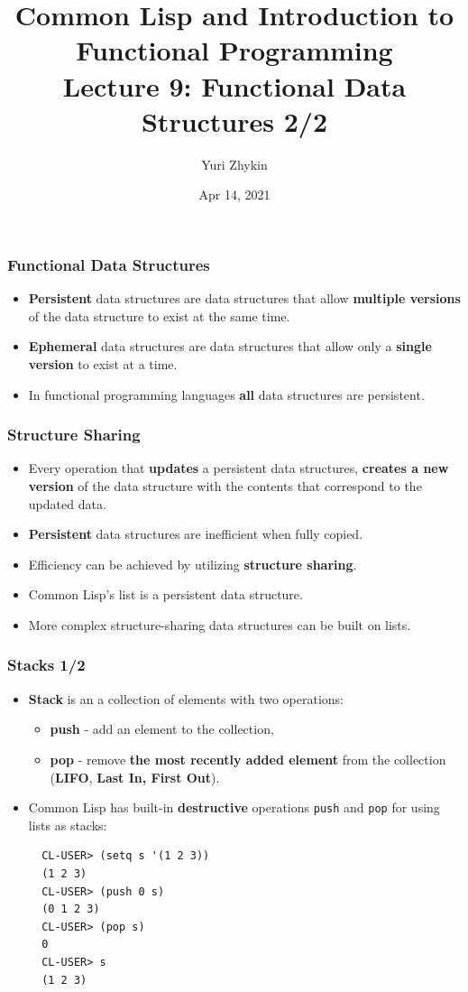 \documentclass{beamer}
\title{
  Common Lisp and Introduction to Functional Programming \\
  Lecture 9: Functional Data Structures 2/2
}
\author{Yuri Zhykin}
\date{Apr 14, 2021}
\begin{document}
\frame{\titlepage}

\begin{frame}[fragile]
  \frametitle{Functional Data Structures}
  \begin{itemize}
  \item \textbf{Persistent} data structures are data structures that allow
    \textbf{multiple versions} of the data structure to exist at the same time.
  \item \textbf{Ephemeral} data structures are data structures that allow only a
    \textbf{single version} to exist at a time.
  \item In functional programming languages \textbf{all} data structures are
    persistent.
  \end{itemize}
\end{frame}

\begin{frame}[fragile]
  \frametitle{Structure Sharing}
  \begin{itemize}
  \item Every operation that \textbf{updates} a persistent data structures,
    \textbf{creates a new version} of the data structure with the contents that
    correspond to the updated data.
  \item \textbf{Persistent} data structures are inefficient when fully copied.
  \item Efficiency can be achieved by utilizing \textbf{structure sharing}.
  \item Common Lisp's list is a persistent data structure.
  \item More complex structure-sharing data structures can be built on lists.
  \end{itemize}
\end{frame}

\begin{frame}[fragile]
  \frametitle{Stacks 1/2}
  \begin{itemize}
  \item \textbf{Stack} is an a collection of elements with two operations:
    \begin{itemize}
    \item \textbf{push} - add an element to the collection,
    \item \textbf{pop} - remove \textbf{the most recently added element} from
      the collection (\textbf{LIFO}, \textbf{Last In, First Out}).
    \end{itemize}
  \item Common Lisp has built-in \textbf{destructive} operations
    \texttt{push} and \texttt{pop} for using lists as
    stacks:
\begin{verbatim}
  CL-USER> (setq s '(1 2 3))
  (1 2 3)
  CL-USER> (push 0 s)
  (0 1 2 3)
  CL-USER> (pop s)
  0
  CL-USER> s
  (1 2 3)
\end{verbatim}
  \end{itemize}
\end{frame}
\end{document}
